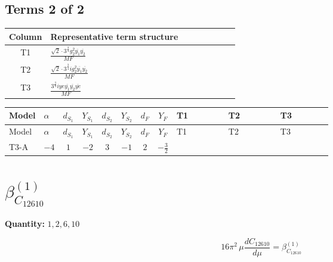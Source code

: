 \documentclass[8pt]{article}
\begin{document}
\begin{landscape}
\subsection*{Terms 2 of 2}
\begin{center}
\begin{tabular}{@{}c >{\raggedright\arraybackslash}p{0.82\linewidth}@{}}
\toprule
Column & Representative term structure \\
\midrule
T1 & \(\displaystyle \frac{\sqrt{2} \cdot 3^{\frac{3}{4}} g_{2}^{2} \overline{y_{1}} \overline{y_{2}}}{MF}\) \\
\midrule
T2 & \(\displaystyle \frac{\sqrt{2} \cdot 3^{\frac{3}{4}} i g_{2}^{2} \overline{y_{1}} \overline{y_{2}}}{MF}\) \\
\midrule
T3 & \(\displaystyle \frac{3^{\frac{3}{4}} i ye \overline{y_{1}} \overline{y_{2}} \overline{ye}}{MF}\) \\
\midrule
\bottomrule
\end{tabular}
\end{center}
\smallskip
\tiny
\begin{longtable}{@{}llcccccc >{\raggedright\arraybackslash}p{0.21\linewidth} >{\raggedright\arraybackslash}p{0.21\linewidth} >{\raggedright\arraybackslash}p{0.21\linewidth}@{}}
\toprule
Model & $\alpha$ & $d_{S_1}$ & $Y_{S_1}$ & $d_{S_2}$ & $Y_{S_2}$ & $d_F$ & $Y_F$ & T1 & T2 & T3 \\
\midrule
\endfirsthead
\toprule
Model & $\alpha$ & $d_{S_1}$ & $Y_{S_1}$ & $d_{S_2}$ & $Y_{S_2}$ & $d_F$ & $Y_F$ & T1 & T2 & T3 \\
\midrule
\endhead
T3-A & $-4$ & $1$ & $-2$ & $3$ & $-1$ & $2$ & $-\frac{3}{2}$ & \scriptsize\adjustbox{max width=\linewidth}{$\begin{gathered} - \frac{\sqrt{2} \cdot 3^{\frac{3}{4}} g_{2}^{2} \overline{y_{1}} \overline{y_{2}}}{6 MF}\end{gathered}$} & \scriptsize\adjustbox{max width=\linewidth}{$\begin{gathered} - \frac{\sqrt{2} \cdot 3^{\frac{3}{4}} i g_{2}^{2} \overline{y_{1}} \overline{y_{2}}}{6 MF}\end{gathered}$} & \scriptsize\adjustbox{max width=\linewidth}{$\begin{gathered} \frac{3^{\frac{3}{4}} i ye \overline{y_{1}} \overline{y_{2}} \overline{ye}}{12 MF}\end{gathered}$} \\
\midrule
\bottomrule
\end{longtable}
\clearpage
\section*{$\beta_{C_{12610}}^{(1)}$}
\noindent\textbf{Quantity: }$\mathrm{1,2,6,10}$\par\smallskip
\[16\pi^2\,\mu\frac{d C_{12610}}{d\mu}=\beta_{C_{12610}}^{(1)}\]

\end{landscape}
\end{document}
